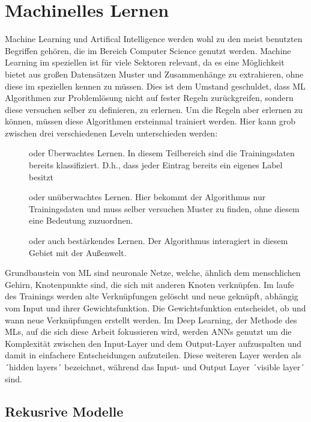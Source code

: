 \section{Machinelles Lernen}
\label{techniques:ml}
Machine Learning und Artifical Intelligence werden wohl zu den meist benutzten Begriffen gehören,
die im Bereich Computer Science genutzt werden.
Machine Learning im speziellen ist für viele Sektoren relevant, da es eine Möglichkeit
bietet aus großen Datensätzen Muster und Zusammenhänge zu extrahieren, ohne diese im
speziellen kennen zu müssen.
Dies ist dem Umstand geschuldet, dass \ac{ML} Algorithmen zur Problemlösung nicht auf
fester Regeln zurückgreifen, sondern diese versuchen selber zu definieren, zu erlernen.
Um die Regeln aber erlernen zu können, müssen diese Algorithmen ersteinmal trainiert werden.
Hier kann grob zwischen drei verschiedenen Leveln unterschieden werden:

\begin{description}
    \item[] oder Überwachtes Lernen. In diesem Teilbereich sind die Trainingsdaten
        bereits klassifiziert. D.h., dass jeder Eintrag bereits ein eigenes Label besitzt
    \item[] oder unüberwachtes Lernen. Hier bekommt der Algorithmus nur
        Trainingsdaten und muss selber versuchen Muster zu finden, ohne diesem eine Bedeutung zuzuordnen.
    \item[] oder auch bestärkendes Lernen. Der Algorithmus interagiert in diesem
        Gebiet mit der Außenwelt.
\end{description}

Grundbaustein von \ac{ML} sind neuronale Netze, welche, ähnlich dem menschlichen Gehirn,
Knotenpunkte sind, die sich mit anderen Knoten verknüpfen. Im laufe des Trainings werden alte
Verknüpfungen gelöscht und neue geknüpft, abhängig vom Input und ihrer Gewichtsfunktion.
Die Gewichtsfunktion entscheidet, ob und wann neue Verknüpfungen erstellt werden.
Im Deep Learning, der Methode des \ac{ML}s, auf die sich diese Arbeit fokussieren wird, werden
\acp{ANN} genutzt um die Komplexität zwischen den Input-Layer und dem Output-Layer
aufzuspalten und damit in einfachere Entscheidungen aufzuteilen. Diese weiteren Layer werden als
´hidden layers´ bezeichnet, während das Input- und Output Layer ´visible layer´ sind.


\subsection{Rekusrive Modelle}
